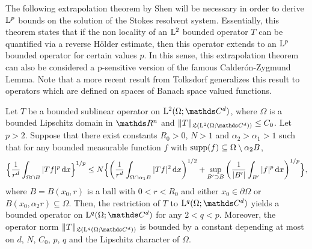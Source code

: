 

The following extrapolation theorem by Shen \cite[Thm. 3.3]{shenExtra} will be necessary in order to derive $\mathrm{L}^p$ bounds on the solution of the Stokes resolvent system.
Essentially, this theorem states that if the non locality of an $\mathrm{L}^2$ bounded operator  $T$ can be quantified via a reverse Hölder estimate, then this operator extends to an $\mathrm{L}^p$ bounded operator for certain values $p$.
In this sense, this extrapolation theorem can also be considered a p-sensitive version of the famous Calder\'on-Zygmund Lemma.
Note that a more recent result from Tolksdorf \cite[Thm. 4.1]{tolksdorf2017} generalizes this result to operators which are defined on spaces of Banach space valued functions.

\begin{thm}
  \label{thm:extrapolation}
  Let $T$ be a bounded sublinear operator on $\Ell^2(\Omega; \C^d)$, where $\Omega$ is a bounded Lipschitz domain in $\R^n$ and $\|T\|_{\Li(\Ell^2(\Omega; \C^d))} \leq C_0$.
  Let $p > 2$.
  Suppose that there exist constants $R_0 > 0$, $N > 1$ and $\alpha_2 > \alpha_1 > 1$ such that for any bounded measurable function $f$ with $\operatorname{supp}(f) \subseteq \Omega \setminus \alpha_2 B$,
  \begin{align*}
    \Big\{ \frac{1}{r^d} \int_{\Omega \cap B} |Tf|^p \, {\operatorname{d}\!{x}} \Big\}^{1/p}
    \leq N \Big\{ \bigg( \frac{1}{r^d} \int_{\Omega \cap \alpha_1 B} |T f|^2 \, {\operatorname{d}\!{x}} \bigg)^{1/2} + \sup_{B' \supset B} \bigg( \frac{1}{|B'|} \int_{B'} |f|^p \, {\operatorname{d}\!{x}} \bigg)^{1/p} \Big\},
  \end{align*}
  where $B = B(x_0, r)$ is a ball with $0 < r < R_0$ and either $x_0 \in \partial\Omega$ or $B(x_0, \alpha_2 r) \subseteq \Omega$.
  Then, the restriction of $T$ to $\Ell^q(\Omega;\C^d)$ yields a bounded operator on $\Ell^q(\Omega; \C^d)$ for any $2 < q < p$.
  Moreover, the operator norm $\|T\|_{\Li(\Ell^q(\Omega; \C^d))}$ is bounded by a constant depending at most on $d$, $N$, $C_0$, $p$, $q$ and the Lipschitz character of $\Omega$.
\end{thm}

